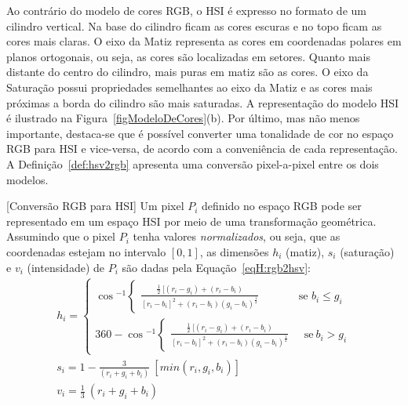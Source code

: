 Ao contrário do modelo de cores RGB, o HSI é expresso no formato de um cilindro vertical.
Na base do cilindro ficam as cores escuras e no topo ficam as cores mais claras.
O eixo da Matiz representa as cores em coordenadas polares em planos ortogonais, ou seja, as cores são localizadas em setores. 
Quanto mais distante do centro do cilindro, mais puras em matiz são as cores.
O eixo da Saturação possui propriedades semelhantes ao eixo da Matiz e as cores mais próximas a borda do cilindro são mais saturadas. 
A representação do modelo HSI é ilustrado na Figura~\ref{figModeloDeCores}(b).
Por último, mas não menos importante, destaca-se que é possível converter uma tonalidade de cor no espaço RGB para HSI e vice-versa, de acordo com a conveniência de cada representação.
A Definição~\ref{def:hsv2rgb} apresenta uma conversão pixel-a-pixel entre os dois modelos.

\begin{definition}\label{def:hsv2rgb}[Conversão RGB para HSI]
Um pixel $P_i$ definido no espaço RGB pode ser representado em um espaço HSI por meio de uma transformação geométrica.
Assumindo que o pixel $P_i$ tenha valores \textit{normalizados}, ou seja, que as coordenadas estejam no intervalo $[0,1]$, as dimensões $h_i$ (matiz), $s_i$ (saturação) e $v_i$ (intensidade) de $P_i$ são dadas pela Equação~\eqref{eqH:rgb2hsv}:
\begin{equation} \label{eqH:rgb2hsv}
\begin{split}
h_i = 
\left \{ 
\begin{matrix} 
    \cos{^{-1}} 
    \left \{ 
    \begin{matrix} 
        \frac 
            {\frac{1}{2} ~ [ (r_i - g_i) + ( r_i - b_i ) }
            {[r_i - b_i ]^2 + (r_i - b_i) (g_i - b_i) ^ { \frac{1}{2} } }
    \end{matrix} 
    \right.
    \quad \quad \quad \: \text{se } b_i  \leq  g_i 
    \\ 
    360 - 
    \cos{^{-1}} 
    \left \{ 
    \begin{matrix} 
        \frac 
            {\frac{1}{2} ~ [ (r_i - g_i) + ( r_i - b_i ) }
            {[r_i - b_i ]^2 + (r_i - b_i) (g_i - b_i) ^ { \frac{1}{2} } }
    \end{matrix} 
    \right.
    \quad \text{se} \: b_i > g_i
\end{matrix} 
\right.
\\
s_i = 1 - \frac{3}{(r_i + g_i + b_i)} ~ [min(r_i, g_i ,b_i)]
\\
v_i =  \frac{1}{3} ~ (r_i + g_i + b_i)
\end{split}
\end{equation}
\end{definition}


